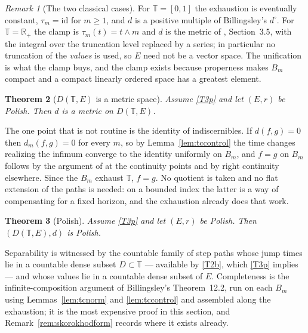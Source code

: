 \documentclass[11pt,a4paper]{article}
\theoremstyle{plain}
\newtheorem{theorem}{Theorem}[section]
\theoremstyle{definition}
\theoremstyle{remark}
\newtheorem{remark}[theorem]{Remark}
\newcommand{\R}{\mathbb{R}}
\newcommand{\Rp}{\R_+}
\newcommand{\T}{\mathbb{T}}                     %
\newcommand{\EK}{\cite{EK86}}
\newcommand{\DT}{D(\T,E)}
\begin{document}
\begin{remark}[The two classical cases]
  \label{rem:dcirccases}
  For $\T = [0,1]$ the exhaustion is eventually constant, $\tau_m = \mathrm{id}$
  for $m \geq 1$, and $d$ is a positive multiple of Billingsley's $d^\circ$.  For
  $\T = \Rp$ the clamp is $\tau_m(t) = t \wedge m$ and $d$ is the metric of \EK,
  Section~3.5, with the integral over the truncation level replaced by a series;
  in particular no truncation of the \emph{values} is used, so $E$ need not be a
  vector space.  The unification is what the clamp buys, and the clamp exists
  because properness makes $B_m$ compact and a compact linearly ordered space has
  a greatest element.
\end{remark}

\begin{theorem}[$\DT$ is a metric space]
  \label{thm:DEmetric}
  Assume \eqref{T3p} and let $(E,r)$ be Polish.  Then $d$ is a metric on $\DT$.
\end{theorem}

The one point that is not routine is the identity of indiscernibles.  If
$d(f,g) = 0$ then $d_m(f,g) = 0$ for every $m$, so by Lemma~\ref{lem:tccontrol}
the time changes realizing the infimum converge to the identity uniformly on
$B_m$, and $f = g$ on $B_m$ follows by the argument of \cite[Ch.~3, \S12]{JS03} at
the continuity points and by right continuity elsewhere.  Since the $B_m$
exhaust $\T$, $f = g$.  No quotient is taken and no flat extension of the paths
is needed: on a bounded index the latter is a way of compensating for a fixed
horizon, and the exhaustion already does that work.

\begin{theorem}[Polish]
  \label{thm:DEpolish}
  Assume \eqref{T3p} and let $(E,r)$ be Polish.  Then $(\DT, d)$ is Polish.
\end{theorem}

Separability is witnessed by the countable family of step paths whose jump times
lie in a countable dense subset $D \subset \T$ --- available by \eqref{T2b},
which \eqref{T3p} implies --- and whose values lie in a countable dense subset of
$E$.  Completeness is the infinite-composition argument of Billingsley's
Theorem~12.2, run on each $B_m$ using Lemmas~\ref{lem:tcnorm} and
\ref{lem:tccontrol} and assembled along the exhaustion; it is the most expensive
proof in this section, and Remark~\ref{rem:skorokhodform} records where it exists
already.

\end{document}

